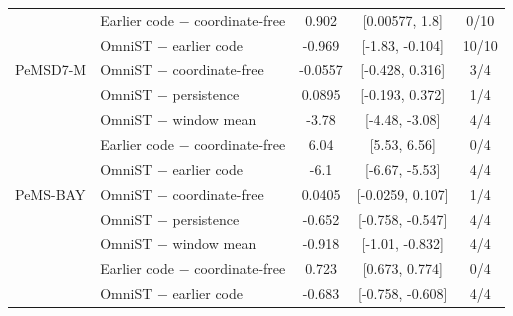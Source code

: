\begin{table}[htbp]
\begin{tabular}{llccc}
 & Earlier code $-$ coordinate-free & 0.902 & [0.00577, 1.8] & 0/10 \\
 & OmniST $-$ earlier code & -0.969 & [-1.83, -0.104] & 10/10 \\
\midrule
PeMSD7-M & OmniST $-$ coordinate-free & -0.0557 & [-0.428, 0.316] & 3/4 \\
 & OmniST $-$ persistence & 0.0895 & [-0.193, 0.372] & 1/4 \\
 & OmniST $-$ window mean & -3.78 & [-4.48, -3.08] & 4/4 \\
 & Earlier code $-$ coordinate-free & 6.04 & [5.53, 6.56] & 0/4 \\
 & OmniST $-$ earlier code & -6.1 & [-6.67, -5.53] & 4/4 \\
\midrule
PeMS-BAY & OmniST $-$ coordinate-free & 0.0405 & [-0.0259, 0.107] & 1/4 \\
 & OmniST $-$ persistence & -0.652 & [-0.758, -0.547] & 4/4 \\
 & OmniST $-$ window mean & -0.918 & [-1.01, -0.832] & 4/4 \\
 & Earlier code $-$ coordinate-free & 0.723 & [0.673, 0.774] & 0/4 \\
 & OmniST $-$ earlier code & -0.683 & [-0.758, -0.608] & 4/4 \\
\bottomrule
\end{tabular}
\end{table}

